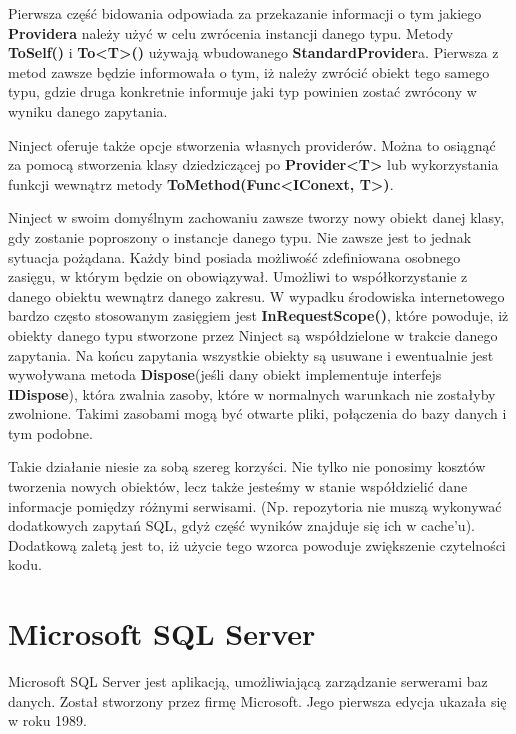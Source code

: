 Pierwsza część bidowania odpowiada za przekazanie informacji o tym jakiego \textbf{Providera} należy użyć w celu zwrócenia instancji danego typu.
Metody \textbf{ToSelf()} i \textbf{To<T>()} używają wbudowanego \textbf{StandardProvider}a. Pierwsza z metod zawsze będzie informowała o tym, iż należy zwrócić obiekt tego samego typu, gdzie druga konkretnie informuje jaki typ powinien zostać zwrócony w wyniku danego zapytania.

Ninject oferuje także opcje stworzenia własnych providerów. Można to osiągnąć za pomocą stworzenia klasy dziedziczącej po \textbf{Provider<T>} lub wykorzystania funkcji wewnątrz metody \textbf{ToMethod(Func<IConext, T>)}.

Ninject w swoim domyślnym zachowaniu zawsze tworzy nowy obiekt danej klasy, gdy zostanie poproszony o instancje danego typu. Nie zawsze jest to jednak sytuacja pożądana. Każdy bind posiada możliwość zdefiniowana osobnego zasięgu, w którym będzie on obowiązywał. Umożliwi to współkorzystanie z danego obiektu wewnątrz danego zakresu. W wypadku środowiska internetowego bardzo często stosowanym zasięgiem jest \textbf{InRequestScope()}, które powoduje, iż obiekty danego typu stworzone przez Ninject są współdzielone w trakcie danego zapytania. Na końcu zapytania wszystkie obiekty są usuwane i ewentualnie jest wywoływana metoda \textbf{Dispose}(jeśli dany obiekt implementuje interfejs \textbf{IDispose}), która zwalnia zasoby, które w normalnych warunkach nie zostałyby zwolnione. Takimi zasobami mogą być otwarte pliki, połączenia do bazy danych i tym podobne.

Takie działanie niesie za sobą szereg korzyści. Nie tylko nie ponosimy kosztów tworzenia nowych obiektów, lecz także jesteśmy w stanie współdzielić dane informacje pomiędzy różnymi serwisami. (Np. repozytoria nie muszą wykonywać dodatkowych zapytań SQL, gdyż część wyników znajduje się ich w cache'u). Dodatkową zaletą jest to, iż użycie tego wzorca powoduje zwiększenie czytelności kodu.

\newpage
{\let\cleardoublepage\relax \chapter{Microsoft SQL Server}}

Microsoft SQL Server\cite{SqlServer} jest aplikacją, umożliwiającą zarządzanie serwerami baz danych. Został stworzony przez firmę Microsoft. Jego pierwsza edycja ukazała się w roku 1989.

